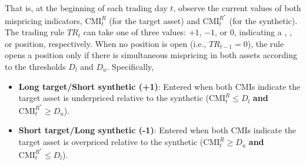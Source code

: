 That is, at the beginning of each trading day \(t\), observe the current values of both mispricing indicators, \(\mathrm{CMI}_t^R\) (for the target asset) and \(\mathrm{CMI}_t^{R^*}\) (for the synthetic). The trading rule \(TR_t\) can take one of three values: \(+1\), \(-1\), or \(0\), indicating a , , or  position, respectively. When no position is open (i.e., \(TR_{t-1} = 0\)), the rule opens a position only if there is simultaneous mispricing in both assets according to the thresholds \(D_l\) and \(D_u\). 
Specifically,
\begin{itemize}
  \item \textbf{Long target/Short synthetic (+1)}: Entered when both CMIs indicate the target asset is underpriced relative to the synthetic ($\text{CMI}_t^R \leq D_l$ \textbf{and} $\text{CMI}_t^{R^*} \geq D_u$).
  \item \textbf{Short target/Long synthetic (-1)}: Entered when both CMIs indicate the target asset is overpriced relative to the synthetic ($\text{CMI}_t^R \geq D_u$ \textbf{and} $\text{CMI}_t^{R^*} \leq D_l$).
\end{itemize} 

